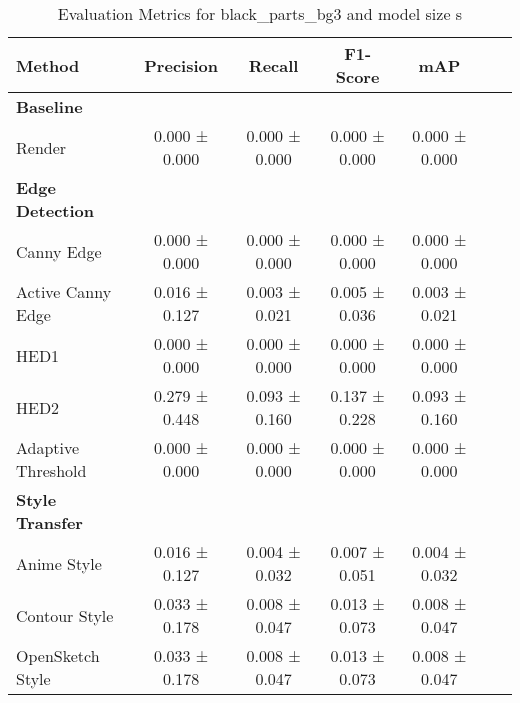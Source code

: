 \begin{table}[H]
    \scriptsize
    \caption{Evaluation Metrics for black_parts_bg3 and model size s}
    \begin{tabular}{lcccccc}
        \toprule
        \textbf{Method} & \textbf{Precision} & \textbf{Recall} & \textbf{F1-Score} & \textbf{mAP} \\
        \midrule
        \textbf{Baseline} & & & & \\
        Render & 0.000 ± 0.000 & 0.000 ± 0.000 & 0.000 ± 0.000 & 0.000 ± 0.000 \\
        \midrule
        \textbf{Edge Detection} & & & & \\
        Canny Edge & 0.000 ± 0.000 & 0.000 ± 0.000 & 0.000 ± 0.000 & 0.000 ± 0.000 \\
        Active Canny Edge & 0.016 ± 0.127 & 0.003 ± 0.021 & 0.005 ± 0.036 & 0.003 ± 0.021 \\
        HED1 & 0.000 ± 0.000 & 0.000 ± 0.000 & 0.000 ± 0.000 & 0.000 ± 0.000 \\
        HED2 & 0.279 ± 0.448 & 0.093 ± 0.160 & 0.137 ± 0.228 & 0.093 ± 0.160 \\
        Adaptive Threshold & 0.000 ± 0.000 & 0.000 ± 0.000 & 0.000 ± 0.000 & 0.000 ± 0.000 \\
        \midrule
        \textbf{Style Transfer} & & & & \\
        Anime Style & 0.016 ± 0.127 & 0.004 ± 0.032 & 0.007 ± 0.051 & 0.004 ± 0.032 \\
        Contour Style & 0.033 ± 0.178 & 0.008 ± 0.047 & 0.013 ± 0.073 & 0.008 ± 0.047 \\
        OpenSketch Style & 0.033 ± 0.178 & 0.008 ± 0.047 & 0.013 ± 0.073 & 0.008 ± 0.047 \\
        \bottomrule
    \end{tabular}
\end{table}